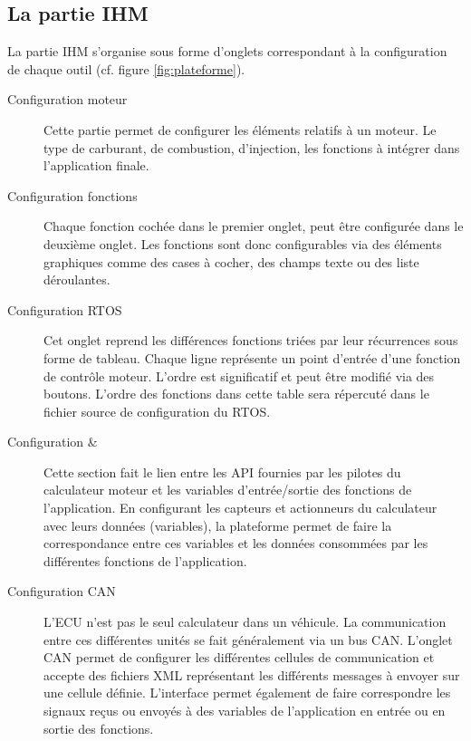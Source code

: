 \subsection{La partie IHM}
La partie IHM s'organise sous forme d'onglets correspondant à la configuration de chaque outil (cf. figure \ref{fig:plateforme}). 
\begin{description}
  \item[Configuration moteur] Cette partie permet de configurer les éléments relatifs à un moteur. Le type de carburant, de combustion, d'injection, les fonctions à intégrer dans l'application finale.
  \item[Configuration fonctions] Chaque fonction cochée dans le premier onglet, peut être configurée dans le deuxième onglet. Les fonctions sont donc configurables via des éléments graphiques comme des cases à cocher, des champs texte ou des liste déroulantes.
  \item[Configuration RTOS] Cet onglet reprend les différences fonctions triées par leur récurrences sous forme de tableau. Chaque ligne représente un point d'entrée d'une fonction de contrôle moteur. L'ordre est significatif et peut être modifié via des boutons. L'ordre des fonctions dans cette table sera répercuté dans le fichier source de configuration du RTOS.
  \item[Configuration  \& ] Cette section fait le lien entre les API fournies par les pilotes du calculateur moteur et les variables d'entrée/sortie des fonctions de l'application. En configurant les capteurs et actionneurs du calculateur avec leurs données (variables), la plateforme permet de faire la correspondance entre ces variables et les données consommées par les différentes fonctions de l'application.
  \item[Configuration CAN] L'ECU n'est pas le seul calculateur dans un véhicule. La communication entre ces différentes unités se fait généralement via un bus CAN. L'onglet CAN permet de configurer les différentes cellules de communication et accepte des fichiers XML représentant les différents messages à envoyer sur une cellule définie. L'interface permet également de faire correspondre les signaux reçus ou envoyés à des variables de l'application en entrée ou en sortie des fonctions.
\end{description}

